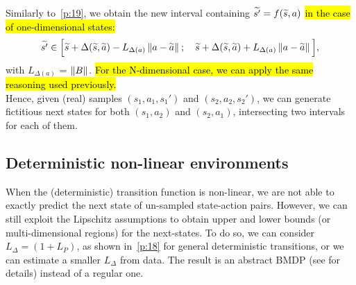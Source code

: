 Similarly to~\eqref{p:19}, we obtain the new interval containing $\widetilde{s'} = f(\widetilde{s}, a)$ \hl{in the case of one-dimensional states:}
\begin{align}
\widetilde{s'} \in \Big[\widetilde{s} + \Delta(\widetilde{s},\widetilde{a}) - L_{\Delta (a)}\left\|a - \widetilde{a}\right\|_{}; \quad \widetilde{s} + \Delta(\widetilde{s},\widetilde{a}) + L_{\Delta (a)}\left\|a - \widetilde{a}\right\|_{} \Big],\label{p:25}
\end{align}
with $L_{\Delta (a)}$ = $\left\|B\right\|_{}$. \hl{For the N-dimensional case, we can apply the same reasoning used previously.}\\
\newline
Hence, given (real) samples $(s_1,a_1,s_1')$ and $(s_2, a_2, s_2')$, we can generate fictitious next states for both $(s_1,a_2)$ and $(s_2,a_1)$, intersecting two intervals for each of them.

\subsection{Deterministic non-linear environments} \label{app:b2}
When the (deterministic) transition function is non-linear, we are not able to exactly predict the next state of un-sampled state-action pairs. However, we can still exploit the Lipschitz assumptions to obtain upper and lower bounds (or multi-dimensional regions) for the next-states. To do so, we can consider $L_{\Delta} = \left(1 + L_{P} \right)$, as shown in~\eqref{p:18} for general deterministic transitions, or we can estimate a smaller $L_{\Delta}$ from data.
The result is an abstract \ac{BMDP} (see  for details) instead of a regular one.\\
\newline
